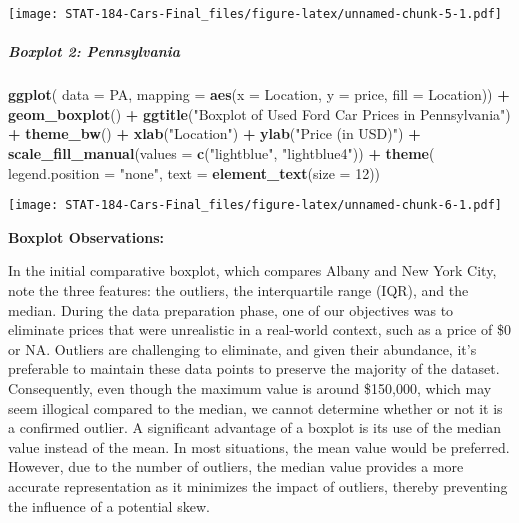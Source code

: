 \documentclass[
]{article}
\newenvironment{Shaded}{\begin{snugshade}}{\end{snugshade}}
\newcommand{\AttributeTok}[1]{\textcolor[rgb]{0.13,0.29,0.53}{#1}}
\newcommand{\DecValTok}[1]{\textcolor[rgb]{0.00,0.00,0.81}{#1}}
\newcommand{\FunctionTok}[1]{\textcolor[rgb]{0.13,0.29,0.53}{\textbf{#1}}}
\newcommand{\NormalTok}[1]{#1}
\newcommand{\SpecialCharTok}[1]{\textcolor[rgb]{0.81,0.36,0.00}{\textbf{#1}}}
\newcommand{\StringTok}[1]{\textcolor[rgb]{0.31,0.60,0.02}{#1}}
\begin{document}
\texttt{[image: STAT-184-Cars-Final\_files/figure-latex/unnamed-chunk-5-1.pdf]}

\hypertarget{boxplot-2-pennsylvania}{%
\subparagraph{Boxplot 2: Pennsylvania}\label{boxplot-2-pennsylvania}}

\begin{Shaded}
\begin{Highlighting}[]
\FunctionTok{ggplot}\NormalTok{(}
\AttributeTok{data =}\NormalTok{ PA,}
\AttributeTok{mapping =} \FunctionTok{aes}\NormalTok{(}\AttributeTok{x =}\NormalTok{ Location, }\AttributeTok{y =}\NormalTok{ price, }\AttributeTok{fill =}\NormalTok{ Location)) }\SpecialCharTok{+}
  \FunctionTok{geom\_boxplot}\NormalTok{() }\SpecialCharTok{+}
  \FunctionTok{ggtitle}\NormalTok{(}\StringTok{"Boxplot of Used Ford Car Prices in Pennsylvania"}\NormalTok{) }\SpecialCharTok{+}
  \FunctionTok{theme\_bw}\NormalTok{() }\SpecialCharTok{+}
  \FunctionTok{xlab}\NormalTok{(}\StringTok{"Location"}\NormalTok{) }\SpecialCharTok{+}
  \FunctionTok{ylab}\NormalTok{(}\StringTok{"Price (in USD)"}\NormalTok{) }\SpecialCharTok{+}
  \FunctionTok{scale\_fill\_manual}\NormalTok{(}\AttributeTok{values =} \FunctionTok{c}\NormalTok{(}\StringTok{"lightblue"}\NormalTok{, }\StringTok{"lightblue4"}\NormalTok{)) }\SpecialCharTok{+}
  \FunctionTok{theme}\NormalTok{(}
  \AttributeTok{legend.position =} \StringTok{"none"}\NormalTok{,}
  \AttributeTok{text =} \FunctionTok{element\_text}\NormalTok{(}\AttributeTok{size =} \DecValTok{12}\NormalTok{))}
\end{Highlighting}
\end{Shaded}

\texttt{[image: STAT-184-Cars-Final\_files/figure-latex/unnamed-chunk-6-1.pdf]}

\textbf{Boxplot Observations:}

In the initial comparative boxplot, which compares Albany and New York
City, note the three features: the outliers, the interquartile range
(IQR), and the median. During the data preparation phase, one of our
objectives was to eliminate prices that were unrealistic in a real-world
context, such as a price of \$0 or NA. Outliers are challenging to
eliminate, and given their abundance, it's preferable to maintain these
data points to preserve the majority of the dataset. Consequently, even
though the maximum value is around \$150,000, which may seem illogical
compared to the median, we cannot determine whether or not it is a
confirmed outlier. A significant advantage of a boxplot is its use of
the median value instead of the mean. In most situations, the mean value
would be preferred. However, due to the number of outliers, the median
value provides a more accurate representation as it minimizes the impact
of outliers, thereby preventing the influence of a potential skew.
\end{document}
